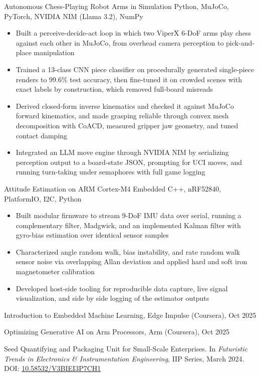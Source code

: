 \documentclass{bmsnkresume}
\begin{document}
\projectentry
  {Autonomous Chess-Playing Robot Arms in Simulation}
  {Python, MuJoCo, PyTorch, NVIDIA NIM (Llama 3.2), NumPy}
\begin{itemize}
  \item Built a perceive-decide-act loop in which two ViperX 6-DoF arms play chess against each other in MuJoCo, from overhead camera perception to pick-and-place manipulation
  \item Trained a 13-class CNN piece classifier on procedurally generated single-piece renders to 99.6\% test accuracy, then fine-tuned it on crowded scenes with exact labels by construction, which removed full-board misreads
  \item Derived closed-form inverse kinematics and checked it against MuJoCo forward kinematics, and made grasping reliable through convex mesh decomposition with CoACD, measured gripper jaw geometry, and tuned contact damping
  \item Integrated an LLM move engine through NVIDIA NIM by serializing perception output to a board-state JSON, prompting for UCI moves, and running turn-taking under semaphores with full game logging
\end{itemize}
\vspace{0.37em}

\projectentry
  {Attitude Estimation on ARM Cortex-M4}
  {Embedded C++, nRF52840, PlatformIO, I2C, Python}
\begin{itemize}
  \item Built modular firmware to stream 9-DoF IMU data over serial, running a complementary filter, Madgwick, and an implemented Kalman filter with gyro-bias estimation over identical sensor samples
  \item Characterized angle random walk, bias instability, and rate random walk sensor noise via overlapping Allan deviation and applied hard and soft iron magnetometer calibration
  \item Developed host-side tooling for reproducible data capture, live signal visualization, and side by side logging of the estimator outputs
\end{itemize}

\vspace{0.65em}
{\color{darktext}Introduction to Embedded Machine Learning, Edge Impulse (Coursera), Oct 2025\par}
{\color{darktext}Optimizing Generative AI on Arm Processors, Arm (Coursera), Oct 2025\par}

\vspace{0.65em}
{\color{darktext}Seed Quantifying and Packaging Unit for Small-Scale Enterprises. In \textit{Futuristic Trends in Electronics \& Instrumentation Engineering}, IIP Series, March 2024. DOI: \href{https://doi.org/10.58532/V3BIEI3P7CH1}{10.58532/V3BIEI3P7CH1}\par}
\end{document}
